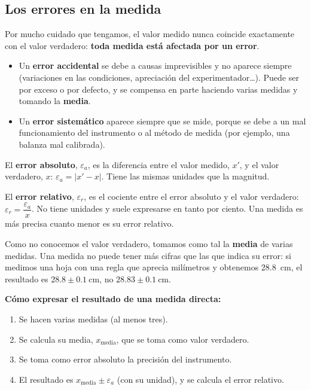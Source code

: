 \subsection{Los errores en la medida}

Por mucho cuidado que tengamos, el valor medido nunca coincide exactamente con el valor verdadero: \textbf{toda medida está afectada por un error}.
\begin{itemize}
    \item Un \textbf{error accidental} se debe a causas imprevisibles y no aparece siempre (variaciones en las condiciones, apreciación del experimentador\ldots). Puede ser por exceso o por defecto, y se compensa en parte haciendo varias medidas y tomando la \textbf{media}.
    \item Un \textbf{error sistemático} aparece siempre que se mide, porque se debe a un mal funcionamiento del instrumento o al método de medida (por ejemplo, una balanza mal calibrada).
\end{itemize}

\begin{definition}
    El \textbf{error absoluto}, \(\varepsilon_a\), es la diferencia entre el valor medido, \(x'\), y el valor verdadero, \(x\): \(\varepsilon_a = |x' - x|\). Tiene las mismas unidades que la magnitud.

    El \textbf{error relativo}, \(\varepsilon_r\), es el cociente entre el error absoluto y el valor verdadero: \(\varepsilon_r = \dfrac{\varepsilon_a}{x}\). No tiene unidades y suele expresarse en tanto por ciento. Una medida es más precisa cuanto menor es su error relativo.
\end{definition}

Como no conocemos el valor verdadero, tomamos como tal la \textbf{media} de varias medidas. Una medida no puede tener más cifras que las que indica su error: si medimos una hoja con una regla que aprecia milímetros y obtenemos \qty{28.8}{\cm}, el resultado es \(\num{28.8} \pm \qty{0.1}{\cm}\), no \(\num{28.83} \pm \qty{0.1}{\cm}\).

\begin{marker}
    \textbf{Cómo expresar el resultado de una medida directa:}
    \begin{enumerate}[label=\arabic*.]
        \item Se hacen varias medidas (al menos tres).
        \item Se calcula su media, \(x_\text{media}\), que se toma como valor verdadero.
        \item Se toma como error absoluto la precisión del instrumento.
        \item El resultado es \(x_\text{media} \pm \varepsilon_a\) (con su unidad), y se calcula el error relativo.
    \end{enumerate}
\end{marker}

